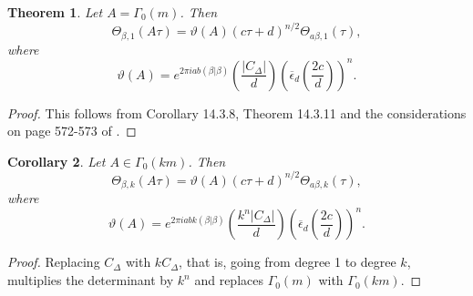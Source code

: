 \documentclass[11pt,a4paper]{amsart}
\newtheorem{theorem}{Theorem}[section]
\newtheorem{corollary}[theorem]{Corollary}
\theoremstyle{definition}
\newcommand{\SZ}{\mathbb{Z}}                    %
\begin{document}
\begin{theorem} Let $A=\Gamma_0(m)$.
Then
\[ \Theta_{\beta,1}(A\tau)= \vartheta(A)(c\tau+d)^{n/2} \Theta_{a\beta,1}(\tau), \]
where
\[ \vartheta(A)=e^{2 \pi i ab (\beta | \beta)} \left(\frac{|C_{\Delta}|}{d}\right)\left(\overline{\epsilon}_d \left(\frac{2c}{d}\right)\right)^n. \]
\end{theorem}
\begin{proof}
This follows from Corollary 14.3.8, Theorem 14.3.11 and the considerations on page 572-573 of \cite{cohen2017modular}.
\end{proof}
\begin{corollary} Let $A \in \Gamma_0(km)$. %
	Then
	\[ \Theta_{\beta,k}(A\tau)= \vartheta(A)(c\tau+d)^{n/2} \Theta_{a\beta,k}(\tau), \]
	where
	\[ \vartheta(A)=e^{2 \pi i abk (\beta | \beta)} \left(\frac{k^n|C_{\Delta}|}{d}\right)\left(\overline{\epsilon}_d \left(\frac{2c}{d}\right)\right)^n. \]
\end{corollary}
\begin{proof} Replacing $C_{\Delta}$ with $kC_{\Delta}$, that is, going from degree 1 to degree $k$, multiplies the determinant by $k^n$ and replaces $\Gamma_0(m)$ with $\Gamma_0(km)$. \end{proof}
\end{document}
